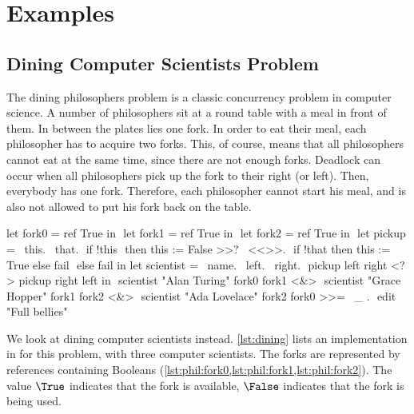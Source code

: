 
\section{Examples}
\label{sec:examples}

\subsection{Dining Computer Scientists Problem}

The dining philosophers problem is a classic concurrency problem in computer science.
A number of philosophers sit at a round table with a meal in front of them.
In between the plates lies one fork.
In order to eat their meal, each philosopher has to acquire two forks.
This, of course, means that all philosophers cannot eat at the same time, since there are not enough forks.
Deadlock can occur when all philosophers pick up the fork to their right (or left).
Then, everybody has one fork.
Therefore, each philosopher cannot start his meal, and is also not allowed to put his fork back on the table.

\begin{TASK}[
    float=ht,
    numbers=right,
    caption={Dining philosophers problem with three computer scientists.},
    label=lst:dining]
  let fork0 = ref True in $\label{lst:phil:fork0}$
  let fork1 = ref True in $\label{lst:phil:fork1}$
  let fork2 = ref True in $\label{lst:phil:fork2}$
  let pickup = \ this. \ that. $\label{lst:phil:this}$
    if !this $\label{lst:phil:deref}$
      then this := False >>? \ <<>>. $\label{lst:phil:mark-used}$
        if !that then this := True else fail $\label{lst:phil:that}$
      else fail in
  let scientist = \ name. \ left. \ right. $\label{lst:phil:scientist}$
    pickup left right <?> pickup right left in $\label{lst:phil:pick}$
  scientist "Alan Turing" fork0 fork1 <&> $\label{lst:phil:scientist0}$
  scientist "Grace Hopper" fork1 fork2 <&> $\label{lst:phil:scientist1}$
  scientist "Ada Lovelace" fork2 fork0 >>= \ _ . $\label{lst:phil:scientist2}$
    edit "Full bellies"
\end{TASK}

We look at dining computer scientists instead.
\cref{lst:dining} lists an implementation in \TOPHAT for this problem, with three computer scientists.
The forks are represented by references containing Booleans (\cref{lst:phil:fork0,lst:phil:fork1,lst:phil:fork2}).
The value $\True$ indicates that the fork is available,
$\False$ indicates that the fork is being used.

